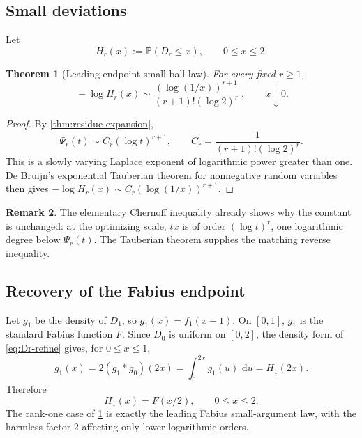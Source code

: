 \documentclass[11pt,a4paper]{article}
\theoremstyle{frontier}
\newtheorem{theorem}{Theorem}[section]
\theoremstyle{definition}
\newtheorem{remark}[theorem]{Remark}
\newcommand{\Pp}{\mathbb P}
\newcommand{\dd}{\,\mathrm d}
\begin{document}
\subsection{Small deviations}

Let
\begin{equation}\label{eq:Hr}
  H_r(x):=\Pp(D_r\le x),\qquad 0\le x\le2.
\end{equation}

\begin{theorem}[Leading endpoint small-ball law]\label{thm:small-ball}
For every fixed $r\ge1$,
\begin{equation}\label{eq:small-ball}
 \boxed{\ 
 -\log H_r(x)
 \sim\frac{(\log(1/x))^{r+1}}
 {(r+1)!(\log2)^r}
 \ },\qquad x\downarrow0.
\end{equation}
\end{theorem}

\begin{proof}
By \cref{thm:residue-expansion},
\[
 \Psi_r(t)\sim C_r(\log t)^{r+1},
 \qquad
 C_r=\frac1{(r+1)!(\log2)^r}.
\]
This is a slowly varying Laplace exponent of logarithmic power greater than one.  De Bruijn's exponential Tauberian theorem for nonnegative random variables \cite{debruijn1959} then gives
$-\log H_r(x)\sim C_r(\log(1/x))^{r+1}$.
\end{proof}

\begin{remark}
The elementary Chernoff inequality already shows why the constant is unchanged: at the optimizing scale, $tx$ is of order $(\log t)^r$, one logarithmic degree below $\Psi_r(t)$.  The Tauberian theorem supplies the matching reverse inequality.
\end{remark}

\subsection{Recovery of the Fabius endpoint}

Let $g_1$ be the density of $D_1$, so $g_1(x)=f_1(x-1)$.  On $[0,1]$, $g_1$ is the standard Fabius function $F$.  Since $D_0$ is uniform on $[0,2]$, the density form of \eqref{eq:Dr-refine} gives, for $0\le x\le1$,
\[
 g_1(x)=2(g_1*g_0)(2x)=\int_0^{2x}g_1(u)\,\dd u=H_1(2x).
\]
Therefore
\begin{equation}\label{eq:H1-F}
  H_1(x)=F(x/2),\qquad 0\le x\le2.
\end{equation}
The rank-one case of \cref{thm:small-ball} is exactly the leading Fabius small-argument law, with the harmless factor $2$ affecting only lower logarithmic orders.
\end{document}
